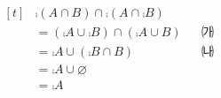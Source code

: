 $\begin{aligned}[t] &\comp{(A\cap B)}\cap\comp{(A\cap\comp{B})}\\ &=(\comp{A}\cup\comp{B})\cap(\comp{A}\cup B) && \text{㈎}\\ &=\comp{A}\cup(\comp{B}\cap B) && \text{㈏}\\ &=\comp{A}\cup\varnothing\\ &=\comp{A} \end{aligned}$

